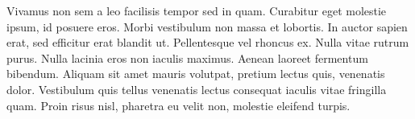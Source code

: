 \documentclass[12pt]{article}
\begin{document}
\begin{multicols}{2}
Vivamus non sem a leo facilisis tempor sed in quam. Curabitur eget molestie ipsum, id posuere eros. Morbi vestibulum non massa et lobortis. In auctor sapien erat, sed efficitur erat blandit ut. Pellentesque vel rhoncus ex. Nulla vitae rutrum purus. Nulla lacinia eros non iaculis maximus. Aenean laoreet fermentum bibendum. Aliquam sit amet mauris volutpat, pretium lectus quis, venenatis dolor. Vestibulum quis tellus venenatis lectus consequat iaculis vitae fringilla quam. Proin risus nisl, pharetra eu velit non, molestie eleifend turpis.

\end{multicols}
\end{document}
